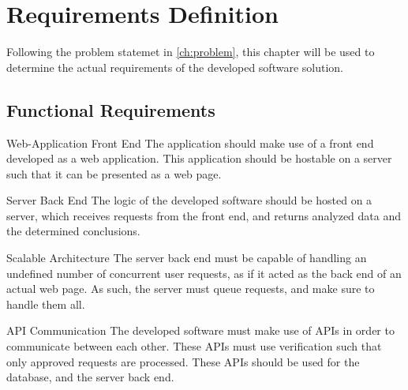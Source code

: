 \chapter{Requirements Definition}\label{cha:req}
Following the problem statemet in \autoref{ch:problem}, this chapter will be
used to determine the actual requirements of the developed software solution.


\section{Functional Requirements}

\begin{requirement}{Web-Application Front End}
The application should make use of a front end developed as a web application.
This application should be hostable on a server such that it can be presented as
a web page.
\end{requirement}

\begin{requirement}{Server Back End}
The logic of the developed software should be hosted on a server, which receives
requests from the front end, and returns analyzed data and the determined
conclusions.
\end{requirement}

\begin{requirement}{Scalable Architecture}
The server back end must be capable of handling an undefined number of
concurrent user requests, as if it acted as the back end of an actual web page.
As such, the server must queue requests, and make sure to handle them all.
\end{requirement}

\begin{requirement}{\ac{API} Communication}
The developed software must make use of \ac{API}s in order to communicate
between each other. These \ac{API}s must use verification such that only
approved requests are processed. These \ac{API}s should be used for the
database, and the server back end.
\end{requirement}

